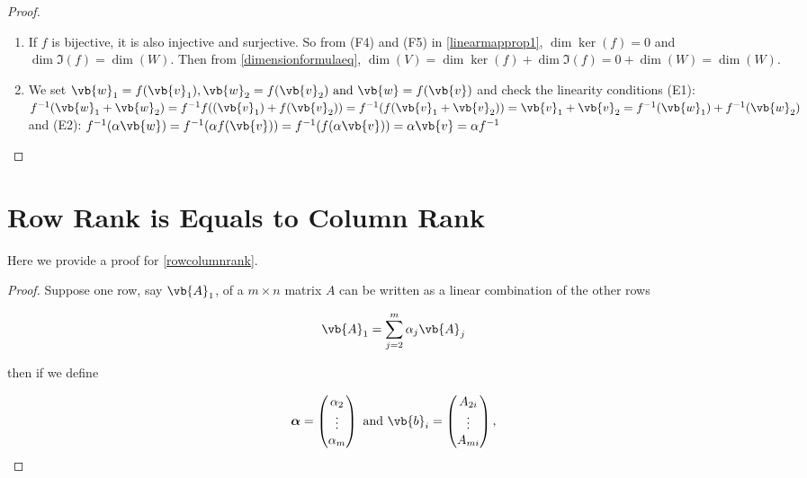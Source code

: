\documentclass[a4paper,12pt]{report}
\begin{document}
\begin{appendices}
\begin{proof}
    \begin{enumerate}[label=(\(G\)\arabic*)]
        \item If \(f\)  is bijective, it is also injective and surjective. So from (F4) and (F5) in \cref{linearmapprop1}, \(\dim \ker (f) = 0\) and \(\dim \Im (f) = \dim (W)\). Then from \cref{dimensionformulaeq}, \(\dim (V) = \dim \ker (f) + \dim \Im (f) = 0 + \dim (W) = \dim (W)\).
        \item We set \(\vb{w} _{1} = f(\vb{v} _{1} ), \vb{w} _{2}  = f(\vb{v} _{2} ) \text { and } \vb{w} = f(\vb{v} )\) and check the linearity conditions (E1): \(f^{-1} (\vb{w} _{1} +\vb{w} _{2} ) = f^{-1} f((\vb{v} _{1}) + f(\vb{v} _{2} )) = f^{-1} (f(\vb{v} _{1} + \vb{v} _{2} )) = \vb{v} _{1} + \vb{v} _{2}  = f^{-1} (\vb{w} _{1}  ) + f^{-1} (\vb{w} _{2} )\) and (E2): \(f^{-1} (\alpha \vb{w} ) = f^{-1} (\alpha f(\vb{v} )) = f^{-1} (f(\alpha \vb{v} )) = \alpha \vb{v} = \alpha f^{-1}\)
    \end{enumerate}
\end{proof}
    
\section{Row Rank is Equals to Column Rank} \label{rowcolumnrankapp}

Here we provide a proof for \cref{rowcolumnrank}.

\begin{proof}
    Suppose one row, say \(\vb{A} _{1} \), of a \(m\times n\) matrix \(A\) can be written as a linear combination of the other rows

    \begin{equation}
        \vb{A} _{1} = \sum_{j=2}^{m} \alpha _{j} \vb{A} _{j} 
    \end{equation}

    then if we define 

    \begin{equation}
        \boldsymbol{\alpha } = \begin{pmatrix}
             \alpha _{2}  \\
             \vdots  \\
             \alpha _{m}  \\
        \end{pmatrix} \text { and } \vb{b} _{i} = \begin{pmatrix}
             A_{2i}   \\
             \vdots   \\
             A_{m i}  \\
        \end{pmatrix} ,
    \end{equation}
        

\end{proof}
\end{appendices}
\end{document}
